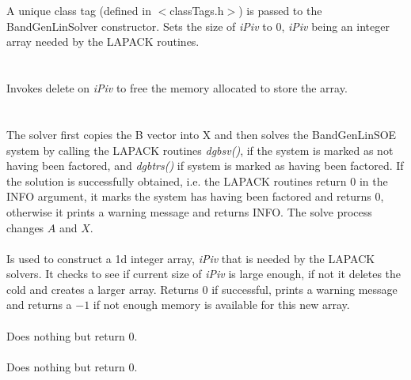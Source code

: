   \\
  \\
A unique class tag (defined in $<$classTags.h$>$) is passed to the
BandGenLinSolver constructor. Sets the size of {\em iPiv} to $0$, {\em
iPiv} being an integer array needed by the LAPACK routines. \\

 \\
\\ 
Invokes delete on {\em iPiv} to free the memory allocated to store the
array. \\ 

  \\
 \\
The solver first copies the B vector into X and then solves the
BandGenLinSOE system by calling the LAPACK routines {\em
dgbsv()}, if the system is marked as not having been factored, and {\em
dgbtrs()} if system is marked as having been factored. If the
solution is successfully obtained, i.e. the LAPACK routines return $0$
in the INFO argument, it marks the system has having been
factored and returns $0$, otherwise it prints a warning message and
returns INFO. The solve process changes $A$ and $X$. \\   

 \\
Is used to construct a 1d integer array, {\em iPiv} that is needed by
the LAPACK solvers. It checks to see if current size of {\em iPiv} is
large enough, if not it deletes the cold and creates a larger
array. Returns $0$ if successful, prints a warning message and returns
a $-1$ if not enough memory is available for this new array. \\


 \\ 
Does nothing but return $0$. \\

 \\ 
Does nothing but return $0$. \\

